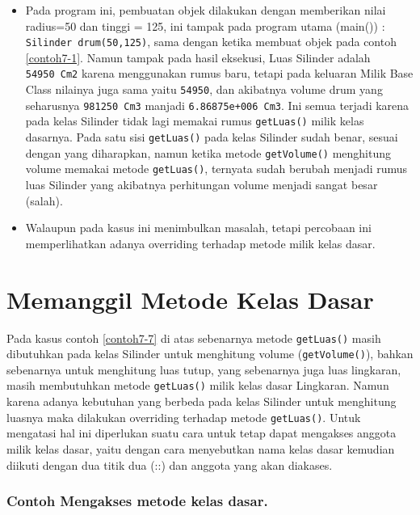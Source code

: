 \begin{itemize}

\item
 Pada program ini, pembuatan objek dilakukan dengan memberikan nilai
 radius=50 dan tinggi = 125, ini tampak pada program utama (main()) :
 \texttt{Silinder\ drum(50,125)}, sama dengan ketika membuat objek pada
 contoh \ref{contoh7-1}. Namun tampak pada hasil eksekusi, Luas Silinder adalah
 \texttt{54950\ Cm2} karena menggunakan rumus baru, tetapi pada
 keluaran Milik Base Class nilainya juga sama yaitu \texttt{54950}, dan
 akibatnya volume drum yang seharusnya \texttt{981250\ Cm3} manjadi
 \texttt{6.86875e+006\ Cm3}. Ini semua terjadi karena pada kelas
 Silinder tidak lagi memakai rumus \texttt{getLuas()} milik kelas
 dasarnya. Pada satu sisi \texttt{getLuas()} pada kelas Silinder sudah
 benar, sesuai dengan yang diharapkan, namun ketika metode
 \texttt{getVolume()} menghitung volume memakai metode
 \texttt{getLuas()}, ternyata sudah berubah menjadi rumus luas Silinder
 yang akibatnya perhitungan volume menjadi sangat besar (salah).
\item
 Walaupun pada kasus ini menimbulkan masalah, tetapi percobaan ini
 memperlihatkan adanya overriding terhadap metode milik kelas dasar.
\end{itemize}

\section{Memanggil Metode Kelas
Dasar}\label{memanggil-metode-kelas-dasar}

Pada kasus contoh \ref{contoh7-7} di atas sebenarnya metode \texttt{getLuas()} masih
dibutuhkan pada kelas Silinder untuk menghitung volume
(\texttt{getVolume()}), bahkan sebenarnya untuk menghitung luas tutup,
yang sebenarnya juga luas lingkaran, masih membutuhkan metode
\texttt{getLuas()} milik kelas dasar Lingkaran. Namun karena adanya
kebutuhan yang berbeda pada kelas Silinder untuk menghitung luasnya maka
dilakukan overriding terhadap metode \texttt{getLuas()}. Untuk mengatasi
hal ini diperlukan suatu cara untuk tetap dapat mengakses anggota milik
kelas dasar, yaitu dengan cara menyebutkan nama kelas dasar kemudian
diikuti dengan dua titik dua (::) dan anggota yang akan diakases.



\subsubsection*{Contoh Mengakses metode kelas dasar.}

